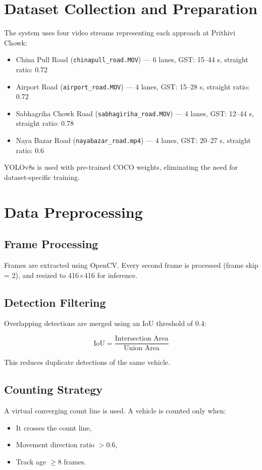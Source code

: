 \section{Dataset Collection and Preparation}

The system uses four video streams representing each approach at Prithivi Chowk:

\begin{itemize}
    \item China Pull Road (\texttt{chinapull\_road.MOV}) — 6 lanes, GST: 15–44 s, straight ratio: 0.72
    \item Airport Road (\texttt{airport\_road.MOV}) — 4 lanes, GST: 15–28 s, straight ratio: 0.72
    \item Sabhagriha Chowk Road (\texttt{sabhagiriha\_road.MOV}) — 4 lanes, GST: 12–44 s, straight ratio: 0.78
    \item Naya Bazar Road (\texttt{nayabazar\_road.mp4}) — 4 lanes, GST: 20–27 s, straight ratio: 0.6
\end{itemize}

YOLOv8s is used with pre-trained COCO weights, eliminating the need for dataset-specific training.

\section{Data Preprocessing}

\subsection{Frame Processing}
Frames are extracted using OpenCV. Every second frame is processed (frame skip = 2), and resized to 416$\times$416 for inference.

\subsection{Detection Filtering}
Overlapping detections are merged using an IoU threshold of 0.4:

\[
\text{IoU} = \frac{\text{Intersection Area}}{\text{Union Area}}
\]

This reduces duplicate detections of the same vehicle.

\subsection{Counting Strategy}
A virtual converging count line is used. A vehicle is counted only when:
\begin{itemize}
    \item It crosses the count line,
    \item Movement direction ratio $> 0.6$,
    \item Track age $\geq 8$ frames.
\end{itemize}

